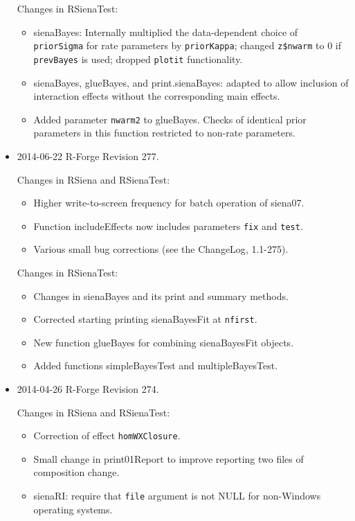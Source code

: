 \documentclass[a4paper,fleqn,11pt]{article}
\newcommand{\+}{\, + \,}
\newcommand{\sfn}[1]{\textsf{#1}}
\begin{document}
\begin{small}
\begin{itemize}
Changes in \textsf{RSienaTest}:
\begin{itemize}
\item  \sfn{sienaBayes}:
    Internally multiplied the data-dependent choice of
     \texttt{priorSigma} for rate parameters by \texttt{priorKappa};
     changed \texttt{z\$nwarm} to 0 if \texttt{prevBayes} is used;
     dropped \texttt{plotit} functionality.
\item  \sfn{sienaBayes}, \sfn{glueBayes}, and
     \sfn{print.sienaBayes}:
      adapted to allow inclusion of interaction effects without the corresponding
     main effects.
\item Added parameter \texttt{nwarm2} to \sfn{glueBayes}.
      Checks of identical prior parameters in this function
      restricted to non-rate parameters.
\end{itemize}


\item 2014-06-22 R-Forge Revision 277.

Changes in \textsf{RSiena} and \textsf{RSienaTest}:
\begin{itemize}
\item Higher write-to-screen frequency for batch operation of \sfn{siena07}.
\item Function \sfn{includeEffects} now includes parameters \texttt{fix} and \texttt{test}.
\item Various small bug corrections (see the \sfn{ChangeLog}, 1.1-275).
\end{itemize}

Changes in \textsf{RSienaTest}:
\begin{itemize}
\item Changes in \sfn{sienaBayes} and its print and summary methods.
\item Corrected starting printing \sfn{sienaBayesFit} at \texttt{nfirst}.
\item New function \sfn{glueBayes} for combining \sfn{sienaBayesFit} objects.
\item Added functions \sfn{simpleBayesTest} and \sfn{multipleBayesTest}.
\end{itemize}

\item 2014-04-26 R-Forge Revision 274.

Changes in \textsf{RSiena} and \textsf{RSienaTest}:
\begin{itemize}
\item Correction of effect \texttt{homWXClosure}.
\item Small change in \textsf{print01Report} to improve reporting
     two files of composition change.
\item \sfn{sienaRI}: require that \texttt{file} argument is not NULL for non-Windows
     operating systems.
\end{itemize}


\end{itemize}
\end{small}
\end{document}
